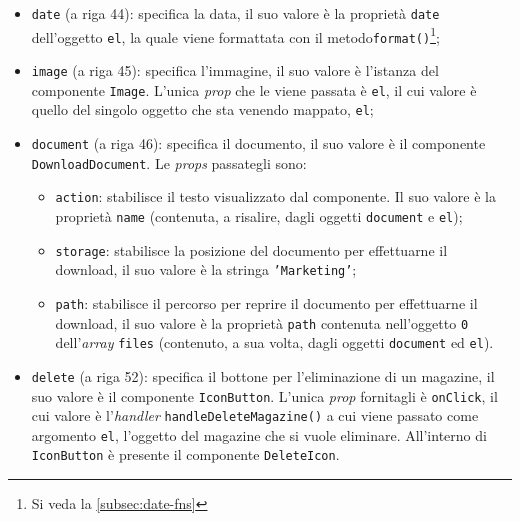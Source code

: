 \begin{itemize}
\begin{itemize}
        \item \texttt{date} (a riga 44): specifica la data, il suo valore è la proprietà \texttt{date}  dell'oggetto \texttt{el}, la quale viene formattata con il metodo\texttt{format()}\footnote{Si veda la \autoref{subsec:date-fns}};
        
        \item \texttt{image} (a riga 45): specifica l'immagine, il suo valore è l'istanza del componente \texttt{Image}. L'unica \textit{prop} che le viene passata è \texttt{el}, il cui valore è quello del singolo oggetto che sta venendo mappato, \texttt{el};
        
        \item \texttt{document} (a riga 46): specifica il documento, il suo valore è il componente \texttt{DownloadDocument}. Le \textit{props} passategli sono:
        \begin{itemize}
            \item \texttt{action}: stabilisce il testo visualizzato dal componente. Il suo valore è la proprietà \texttt{name} (contenuta, a risalire, dagli oggetti \texttt{document} e \texttt{el});
            
            \item \texttt{storage}: stabilisce la posizione del documento per effettuarne il download, il suo valore è la stringa \texttt{'Marketing'};
            
            \item \texttt{path}: stabilisce il percorso per reprire il documento per effettuarne il download, il suo valore è la proprietà \texttt{path} contenuta nell'oggetto \texttt{0} dell'\textit{array} \texttt{files} (contenuto, a sua volta, dagli oggetti \texttt{document} ed \texttt{el}).
        \end{itemize}
        
        \item \texttt{delete} (a riga 52): specifica il bottone per l'eliminazione di un magazine, il suo valore è il componente \texttt{IconButton}. L'unica \textit{prop} fornitagli è \texttt{onClick}, il cui valore è l'\textit{handler} \texttt{handleDeleteMagazine()} a cui viene passato come argomento \texttt{el}, l'oggetto del magazine che si vuole eliminare. All'interno di \texttt{IconButton} è presente il componente \texttt{DeleteIcon}.
    \end{itemize} 
\end{itemize}

